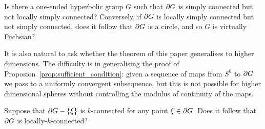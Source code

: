 \documentclass[a4paper]{article}
\begin{document}
\begin{question} Is there a one-ended hyperbolic group $G$ such that $\partial
  G$ is simply connected but not locally simply connected? Conversely, if
  $\partial G$ is locally simply connected but not simply connected, does it
  follow that $\partial G$ is a circle, and so $G$ is virtually Fuchsian?
\end{question}

It is also natural to ask whether the theorem of this paper generalises to
higher dimensions. The difficulty is in generalising the proof of
Proposion~\ref{prop:sufficient_condition}: given a sequence of maps from $S^0$
to $\partial G$ we pass to a uniformly convergent subsequence, but this is not
possible for higher dimensional spheres without controlling the modulus of
continuity of the maps.

\begin{question} Suppose that $\partial G - \left\{\xi\right\}$ is $k$-connected for any
  point $\xi \in \partial G$. Does it follow that $\partial G$ is
  locally-$k$-connected?
\end{question}


\end{document}
